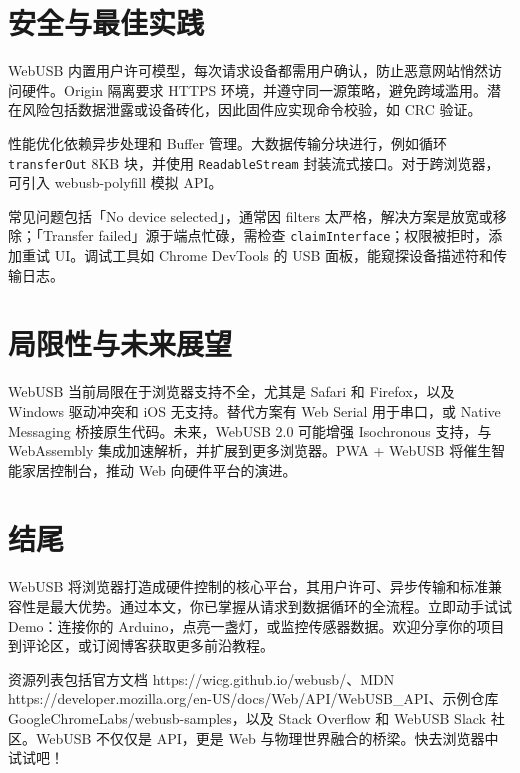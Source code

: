 \chapter{安全与最佳实践}
WebUSB 内置用户许可模型，每次请求设备都需用户确认，防止恶意网站悄然访问硬件。Origin 隔离要求 HTTPS 环境，并遵守同一源策略，避免跨域滥用。潜在风险包括数据泄露或设备砖化，因此固件应实现命令校验，如 CRC 验证。\par
性能优化依赖异步处理和 Buffer 管理。大数据传输分块进行，例如循环 \texttt{transferOut} 8KB 块，并使用 \texttt{ReadableStream} 封装流式接口。对于跨浏览器，可引入 webusb-polyfill 模拟 API。\par
常见问题包括「No device selected」，通常因 filters 太严格，解决方案是放宽或移除；「Transfer failed」源于端点忙碌，需检查 \texttt{claimInterface}；权限被拒时，添加重试 UI。调试工具如 Chrome DevTools 的 USB 面板，能窥探设备描述符和传输日志。\par
\chapter{局限性与未来展望}
WebUSB 当前局限在于浏览器支持不全，尤其是 Safari 和 Firefox，以及 Windows 驱动冲突和 iOS 无支持。替代方案有 Web Serial 用于串口，或 Native Messaging 桥接原生代码。未来，WebUSB 2.0 可能增强 Isochronous 支持，与 WebAssembly 集成加速解析，并扩展到更多浏览器。PWA + WebUSB 将催生智能家居控制台，推动 Web 向硬件平台的演进。\par
\chapter{结尾}
WebUSB 将浏览器打造成硬件控制的核心平台，其用户许可、异步传输和标准兼容性是最大优势。通过本文，你已掌握从请求到数据循环的全流程。立即动手试试 Demo：连接你的 Arduino，点亮一盏灯，或监控传感器数据。欢迎分享你的项目到评论区，或订阅博客获取更多前沿教程。\par
资源列表包括官方文档 https://wicg.github.io/webusb/、MDN https://developer.mozilla.org/en-US/docs/Web/API/WebUSB\_{}API、示例仓库 GoogleChromeLabs/webusb-samples，以及 Stack Overflow 和 WebUSB Slack 社区。WebUSB 不仅仅是 API，更是 Web 与物理世界融合的桥梁。快去浏览器中试试吧！\par
